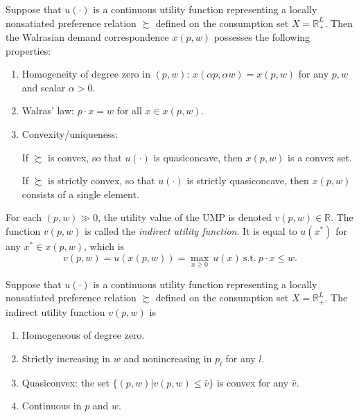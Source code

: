 \documentclass[12pt,fleqn]{book} %
\begin{document}
\begin{proposition}
	 Suppose that $u(\cdot)$ is a continuous utility function representing a locally nonsatiated preference relation $\succsim$ defined on the consumption set $X=\mathbb{R}_+^L$. Then the Walrasian demand correspondence $x(p, w)$ possesses the following
	 properties:
	 \begin{enumerate}
	 	\item Homogeneity of degree zero in $( p , w )$: $x(\alpha p, \alpha w) = x(p, w)$ for any $p, w$	and scalar $\alpha > 0$.
	 	\item Walras' law: $p\cdot x = w$ for all $x\in x(p,w)$.
	 	\item Convexity/uniqueness:
	 	
	 	 If $\succsim$ is convex, so that $u(\cdot)$ is quasiconcave, then $x(p, w)$ is a convex set. 
	 	 
	 	 If $\succsim$ is strictly convex, so that $u(\cdot)$ is strictly quasiconcave, then $x(p, w)$ consists of a single element.
	 \end{enumerate}
\end{proposition}

\begin{definition}
	For each $(p, w) \gg 0$, the utility value of the UMP is denoted $v(p, w)\in \mathbb{R}$. The function $v(p, w)$ is called the \emph{indirect utility function}. It is equal to $u(x^*)$ for any $x^*\in x(p, w)$, which is
	\[
	v(p, w)=u(x(p, w))=\max_{x\ge 0}\, u(x)\ \mathrm{s.t.}\  p\cdot x\le w.
	\]
	
\end{definition}


\begin{proposition}
	Suppose that $u(\cdot)$ is a continuous utility function representing a
	locally nonsatiated preference relation $\succsim$ defined on the consumption set $X=\mathbb{R}_+^L$. The indirect utility function $v(p, w)$ is	
	\begin{enumerate}
		\item Homogeneous of degree zero.
		\item Strictly increasing in $w$ and nonincreasing in $p_l$ for any $l$.
		\item Quasiconvex: the set $\{(p, w)| v(p, w)\le \bar{v}\}$ is convex for any $\bar{v}$.
		\item Continuous in $p$ and $w$. 
	\end{enumerate}
\end{proposition}
\end{document}
